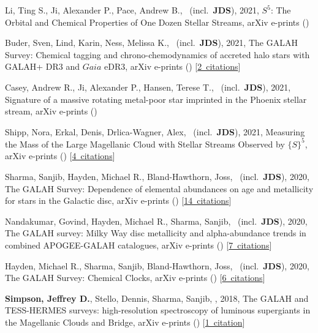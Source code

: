 \item[{\color{numcolor}\scriptsize8}] Li, Ting S., Ji, Alexander P., Pace, Andrew B., \etal\ (incl.\ \textbf{JDS}), 2021, $S^5$: The Orbital and Chemical Properties of One Dozen Stellar Streams, arXiv e-prints ()

\item[{\color{numcolor}\scriptsize7}] Buder, Sven, Lind, Karin, Ness, Melissa K., \etal\ (incl.\ \textbf{JDS}), 2021, The GALAH Survey: Chemical tagging and chrono-chemodynamics of accreted halo stars with GALAH+ DR3 and $Gaia$ eDR3, arXiv e-prints () [\href{https://ui.adsabs.harvard.edu/#abs/2021arXiv210904059B}{2~citations}]

\item[{\color{numcolor}\scriptsize6}] Casey, Andrew R., Ji, Alexander P., Hansen, Terese T., \etal\ (incl.\ \textbf{JDS}), 2021, Signature of a massive rotating metal-poor star imprinted in the Phoenix stellar stream, arXiv e-prints ()

\item[{\color{numcolor}\scriptsize5}] Shipp, Nora, Erkal, Denis, Drlica-Wagner, Alex, \etal\ (incl.\ \textbf{JDS}), 2021, Measuring the Mass of the Large Magellanic Cloud with Stellar Streams Observed by ${\{}S{\}}^5$, arXiv e-prints () [\href{https://ui.adsabs.harvard.edu/#abs/2021arXiv210713004S}{4~citations}]

\item[{\color{numcolor}\scriptsize4}] Sharma, Sanjib, Hayden, Michael R., Bland-Hawthorn, Joss, \etal\ (incl.\ \textbf{JDS}), 2020, The GALAH Survey: Dependence of elemental abundances on age and metallicity for stars in the Galactic disc, arXiv e-prints () [\href{https://ui.adsabs.harvard.edu/#abs/2020arXiv201113818S}{14~citations}]

\item[{\color{numcolor}\scriptsize3}] Nandakumar, Govind, Hayden, Michael R., Sharma, Sanjib, \etal\ (incl.\ \textbf{JDS}), 2020, The GALAH survey: Milky Way disc metallicity and alpha-abundance trends in combined APOGEE-GALAH catalogues, arXiv e-prints () [\href{https://ui.adsabs.harvard.edu/#abs/2020arXiv201102783N}{7~citations}]

\item[{\color{numcolor}\scriptsize2}] Hayden, Michael R., Sharma, Sanjib, Bland-Hawthorn, Joss, \etal\ (incl.\ \textbf{JDS}), 2020, The GALAH Survey: Chemical Clocks, arXiv e-prints () [\href{https://ui.adsabs.harvard.edu/#abs/2020arXiv201113745H}{6~citations}]

\item[{\color{numcolor}\scriptsize1}] \textbf{Simpson, Jeffrey D.}, Stello, Dennis, Sharma, Sanjib, \etal, 2018, The GALAH and TESS-HERMES surveys: high-resolution spectroscopy of luminous supergiants in the Magellanic Clouds and Bridge, arXiv e-prints () [\href{https://ui.adsabs.harvard.edu/#abs/2018arXiv180405900S}{1~citation}]